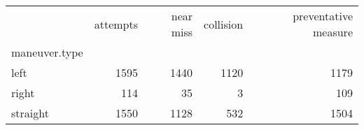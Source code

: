 \begin{tabular}{lrrrr}
\toprule
{} &  attempts &  near miss &  collision &  preventative measure \\
maneuver.type &           &            &            &                       \\
\midrule
left          &      1595 &       1440 &       1120 &                  1179 \\
right         &       114 &         35 &          3 &                   109 \\
straight      &      1550 &       1128 &        532 &                  1504 \\
\bottomrule
\end{tabular}

